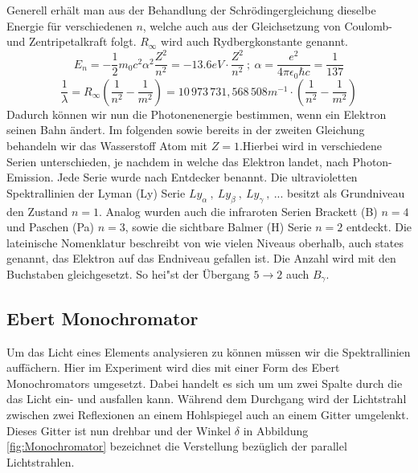 \documentclass[]{article}
\begin{document}
Generell erhält man aus der Behandlung der Schrödingergleichung dieselbe Energie für verschiedenen $n$, welche auch aus der Gleichsetzung von Coulomb- und Zentripetalkraft folgt. $R_\infty$ wird auch Rydbergkonstante genannt. 
\begin{equation}\label{eq:Energieniveaus_H}
E_n = -\frac{1}{2} m_0 c^2 \alpha^2 \frac{Z^2}{n^2} = -13.6eV \cdot \frac{Z^2}{n^2} \: ; \: \alpha = \frac{e^2}{4\pi\epsilon_0 \hbar c} = \frac{1}{137}
\end{equation}
\begin{equation}\label{eq:deltaE_H}
\frac{1}{\lambda} = R_\infty \left(\frac{1}{n^2} - \frac{1}{m^2} \right)  = 10\,973\,731{,}568\,508 m^{-1} \cdot \left(\frac{1}{n^2} - \frac{1}{m^2} \right)
\end{equation}
Dadurch können wir nun die Photonenenergie bestimmen, wenn ein Elektron seinen Bahn ändert. Im folgenden sowie bereits in der zweiten Gleichung behandeln wir das Wasserstoff Atom mit $Z=1$.Hierbei wird in verschiedene Serien unterschieden, je nachdem in welche das Elektron landet, nach Photon-Emission. Jede Serie wurde nach Entdecker benannt. Die ultravioletten Spektrallinien der Lyman (Ly) Serie $Ly_\alpha \:,\: Ly_\beta \:,\: Ly_\gamma \:,\: ...$ besitzt als Grundniveau den Zustand $n=1$. Analog wurden auch die infraroten Serien Brackett (B) $n=4$ und Paschen (Pa) $n=3$, sowie die sichtbare Balmer (H) Serie $n=2$ entdeckt. 
Die lateinische Nomenklatur beschreibt von wie vielen Niveaus oberhalb, auch states genannt, das Elektron auf das Endniveau gefallen ist. Die Anzahl wird mit den Buchstaben gleichgesetzt. So hei"st der \"Ubergang $5 \rightarrow 2$ auch $B_\gamma$.

\subsection{Ebert Monochromator}
Um das Licht eines Elements analysieren zu können müssen wir die Spektrallinien auffächern. Hier im Experiment wird dies mit einer Form des Ebert Monochromators umgesetzt. Dabei handelt es sich um um zwei  Spalte durch die das Licht ein- und ausfallen kann. Während dem Durchgang wird der Lichtstrahl zwischen zwei Reflexionen an einem Hohlspiegel auch an einem Gitter umgelenkt. Dieses Gitter ist nun drehbar und der Winkel $\delta$ in  Abbildung \ref{fig:Monochromator} bezeichnet die Verstellung bezüglich der parallel Lichtstrahlen. 
\end{document}
